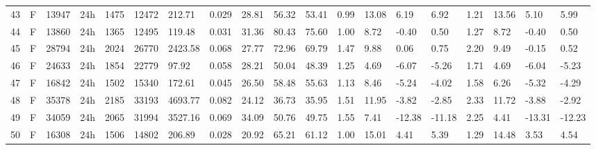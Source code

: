 \begin{tabular}{rllllllrlllllllllll}
43 & F & 13947 & 24h & 1475 & 12472 & 212.71 & 0.029 & 28.81 & 56.32 & 53.41 & 0.99 & 13.08 & 6.19 & 6.92 & 1.21 & 13.56 & 5.10 & 5.99 \\
44 & F & 13860 & 24h & 1365 & 12495 & 119.48 & 0.031 & 31.36 & 80.43 & 75.60 & 1.00 & 8.72 & -0.40 & 0.50 & 1.27 & 8.72 & -0.40 & 0.50 \\
45 & F & 28794 & 24h & 2024 & 26770 & 2423.58 & 0.068 & 27.77 & 72.96 & 69.79 & 1.47 & 9.88 & 0.06 & 0.75 & 2.20 & 9.49 & -0.15 & 0.52 \\
46 & F & 24633 & 24h & 1854 & 22779 & 97.92 & 0.058 & 28.21 & 50.04 & 48.39 & 1.25 & 4.69 & -6.07 & -5.26 & 1.71 & 4.69 & -6.04 & -5.23 \\
47 & F & 16842 & 24h & 1502 & 15340 & 172.61 & 0.045 & 26.50 & 58.48 & 55.63 & 1.13 & 8.46 & -5.24 & -4.02 & 1.58 & 6.26 & -5.32 & -4.29 \\
48 & F & 35378 & 24h & 2185 & 33193 & 4693.77 & 0.082 & 24.12 & 36.73 & 35.95 & 1.51 & 11.95 & -3.82 & -2.85 & 2.33 & 11.72 & -3.88 & -2.92 \\
49 & F & 34059 & 24h & 2065 & 31994 & 3527.16 & 0.069 & 34.09 & 50.76 & 49.75 & 1.55 & 7.41 & -12.38 & -11.18 & 2.25 & 4.41 & -13.31 & -12.23 \\
50 & F & 16308 & 24h & 1506 & 14802 & 206.89 & 0.028 & 20.92 & 65.21 & 61.12 & 1.00 & 15.01 & 4.41 & 5.39 & 1.29 & 14.48 & 3.53 & 4.54 \\
\bottomrule
\end{tabular}
